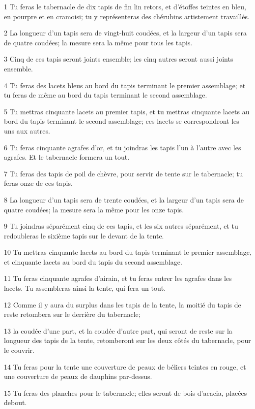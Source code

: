 \par 1 Tu feras le tabernacle de dix tapis de fin lin retors, et d'étoffes teintes en bleu, en pourpre et en cramoisi; tu y représenteras des chérubins artistement travaillés.
\par 2 La longueur d'un tapis sera de vingt-huit coudées, et la largeur d'un tapis sera de quatre coudées; la mesure sera la même pour tous les tapis.
\par 3 Cinq de ces tapis seront joints ensemble; les cinq autres seront aussi joints ensemble.
\par 4 Tu feras des lacets bleus au bord du tapis terminant le premier assemblage; et tu feras de même au bord du tapis terminant le second assemblage.
\par 5 Tu mettras cinquante lacets au premier tapis, et tu mettras cinquante lacets au bord du tapis terminant le second assemblage; ces lacets se correspondront les uns aux autres.
\par 6 Tu feras cinquante agrafes d'or, et tu joindras les tapis l'un à l'autre avec les agrafes. Et le tabernacle formera un tout.
\par 7 Tu feras des tapis de poil de chèvre, pour servir de tente sur le tabernacle; tu feras onze de ces tapis.
\par 8 La longueur d'un tapis sera de trente coudées, et la largeur d'un tapis sera de quatre coudées; la mesure sera la même pour les onze tapis.
\par 9 Tu joindras séparément cinq de ces tapis, et les six autres séparément, et tu redoubleras le sixième tapis sur le devant de la tente.
\par 10 Tu mettras cinquante lacets au bord du tapis terminant le premier assemblage, et cinquante lacets au bord du tapis du second assemblage.
\par 11 Tu feras cinquante agrafes d'airain, et tu feras entrer les agrafes dans les lacets. Tu assembleras ainsi la tente, qui fera un tout.
\par 12 Comme il y aura du surplus dans les tapis de la tente, la moitié du tapis de reste retombera sur le derrière du tabernacle;
\par 13 la coudée d'une part, et la coudée d'autre part, qui seront de reste sur la longueur des tapis de la tente, retomberont sur les deux côtés du tabernacle, pour le couvrir.
\par 14 Tu feras pour la tente une couverture de peaux de béliers teintes en rouge, et une couverture de peaux de dauphins par-dessus.
\par 15 Tu feras des planches pour le tabernacle; elles seront de bois d'acacia, placées debout.
